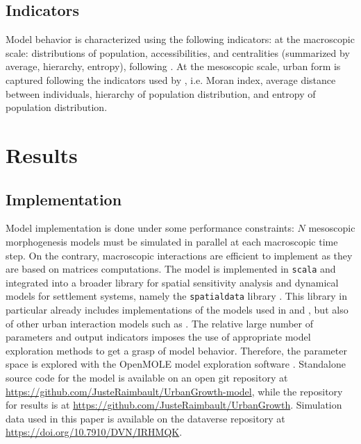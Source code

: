 \documentclass[ijgi,article,submit,moreauthors,pdftex]{Definitions/mdpi}
\begin{document}

\subsection{Indicators}

Model behavior is characterized using the following indicators: at the  macroscopic scale: distributions of population, accessibilities, and centralities (summarized by average, hierarchy, entropy), following \cite{raimbault2020unveiling}. At the mesoscopic scale, urban form is captured following the indicators used by \cite{raimbault2018calibration}, i.e. Moran index, average distance between individuals, hierarchy of population distribution, and entropy of population distribution.


\section{Results}



\subsection{Implementation}

Model implementation is done under some performance constraints: $N$ mesoscopic morphogenesis models must be simulated in parallel at each macroscopic time step. On the contrary, macroscopic interactions are efficient to implement as they are based on matrices computations. The model is implemented in \texttt{scala} and integrated into a broader library for spatial sensitivity analysis and dynamical models for settlement systems, namely the \texttt{spatialdata} library \cite{raimbault2020scala}. This library in particular already includes implementations of the models used in \cite{raimbault2020indirect} and \cite{raimbault2018calibration}, but also of other urban interaction models such as \cite{favaro2011gibrat}. The relative large number of parameters and output indicators imposes the use of appropriate model exploration methods to get a grasp of model behavior. Therefore, the parameter space is explored with the OpenMOLE model exploration software \cite{reuillon2013openmole}. Standalone source code for the model is available on an open git repository at \url{https://github.com/JusteRaimbault/UrbanGrowth-model}, while the repository for results is at \url{https://github.com/JusteRaimbault/UrbanGrowth}. Simulation data used in this paper is available on the dataverse repository at \url{https://doi.org/10.7910/DVN/IRHMQK}.
\end{document}
